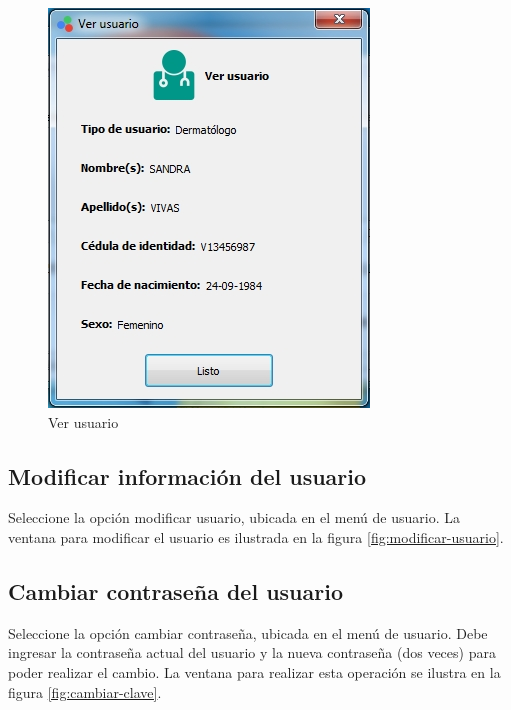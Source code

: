 \begin{figure}[H]
  \centering
  \includegraphics[width=.5\linewidth]{./img/ver-usuario.jpg}
\caption[]{Ver usuario\label{fig:ver-usuario}}
\end{figure}
\vfill
\newpage

	\subsection*{Modificar informaci\'{o}n del usuario}

	Seleccione la opci\'{o}n modificar usuario, ubicada en el men\'{u} de usuario. La ventana para modificar el usuario es ilustrada en la figura \ref{fig:modificar-usuario}.

	\subsection*{Cambiar contrase\~{n}a del usuario}

	Seleccione la opci\'{o}n cambiar contrase\~{n}a, ubicada en el men\'{u} de usuario. Debe ingresar la contrase\~{n}a actual del usuario y la nueva contrase\~{n}a (dos veces) para poder realizar el cambio. La ventana para realizar esta operaci\'{o}n se ilustra en la figura \ref{fig:cambiar-clave}.

